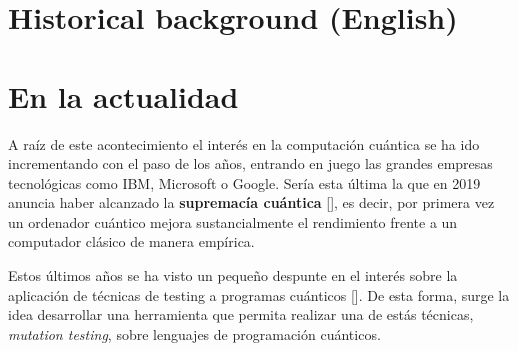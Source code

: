 \section{Historical background (English)}

\section{En la actualidad}

A raíz de este acontecimiento el interés en la computación cuántica se ha ido incrementando con el paso de los años, entrando en juego las grandes empresas tecnológicas como IBM, Microsoft o Google.
Sería esta última la que en 2019 anuncia haber alcanzado la \textbf{supremacía cuántica} [\cite{arute2019quantum}], es decir, por primera vez un ordenador cuántico mejora sustancialmente el rendimiento frente a un computador clásico de manera empírica.

Estos últimos años se ha visto un pequeño despunte en el interés sobre la aplicación de técnicas de testing a programas cuánticos [\cite{usaolaquantum}]. De esta forma, surge la idea desarrollar una herramienta que permita realizar una de estás técnicas, \textit{mutation testing}, sobre lenguajes de programación cuánticos.

